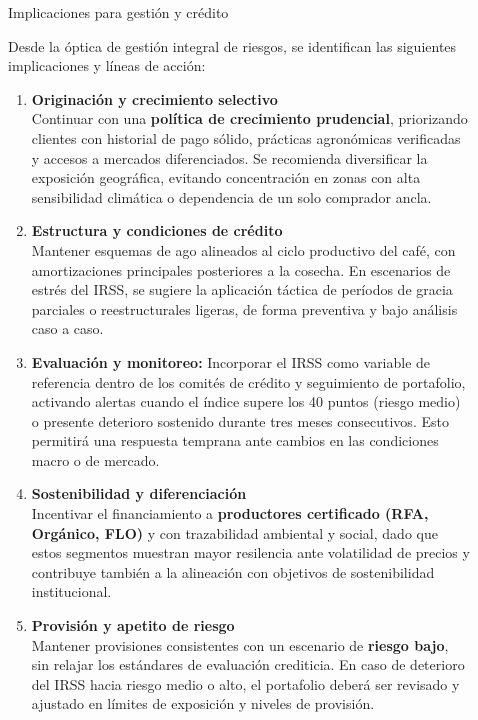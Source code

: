 \documentclass[final]{beamer}
\newlength{\sepwidth}
\newlength{\colwidth}
\newcommand{\separatorcolumn}{\begin{column}{\sepwidth}\end{column}}
\begin{document}
\begin{frame}[t]
\begin{columns}[t]
\begin{column}{\colwidth}
\end{column}

\separatorcolumn

\begin{column}{\colwidth}
  \begin{exampleblock}{Implicaciones para gestión y crédito}
  
  Desde la óptica de gestión integral de riesgos, se identifican las siguientes implicaciones y líneas de acción: 
  \begin{enumerate}
  \item \textbf{Originación y crecimiento selectivo} \\
  Continuar con una \textbf{política de crecimiento prudencial}, priorizando clientes con historial de pago sólido, prácticas agronómicas verificadas y accesos a mercados diferenciados. Se recomienda diversificar la exposición geográfica, evitando concentración en zonas con alta sensibilidad climática o dependencia de un solo comprador ancla. 
  \item \textbf{Estructura y condiciones de crédito}\\ 
  Mantener esquemas de ago alineados al ciclo productivo del café, con amortizaciones principales posteriores a la cosecha. En escenarios de estrés del IRSS, se sugiere la aplicación táctica de períodos de gracia parciales o reestructurales ligeras, de forma preventiva y bajo análisis caso a caso. 
  \item \textbf{Evaluación y monitoreo:} Incorporar el IRSS como variable de referencia dentro de los comités de crédito y seguimiento de portafolio, activando alertas cuando el índice supere los 40 puntos (riesgo medio) o presente deterioro sostenido durante tres meses consecutivos. Esto permitirá una respuesta temprana ante cambios en las condiciones macro o de mercado. 
  \item \textbf{Sostenibilidad y diferenciación}\\
  Incentivar el financiamiento a \textbf{productores certificado (RFA, Orgánico, FLO)} y con trazabilidad ambiental y social, dado que estos segmentos muestran mayor resilencia ante volatilidad de precios y contribuye también a la alineación con objetivos de sostenibilidad institucional.  
  \item \textbf{Provisión y apetito de riesgo}\\
  Mantener provisiones consistentes con un escenario de \textbf{riesgo bajo}, sin relajar los estándares de evaluación crediticia. En caso de deterioro del IRSS hacia riesgo medio o alto, el portafolio deberá ser revisado y ajustado en límites de exposición y niveles de provisión. 

\end{enumerate}
\end{exampleblock}
\end{column}
\end{columns}
\end{frame}
\end{document}
